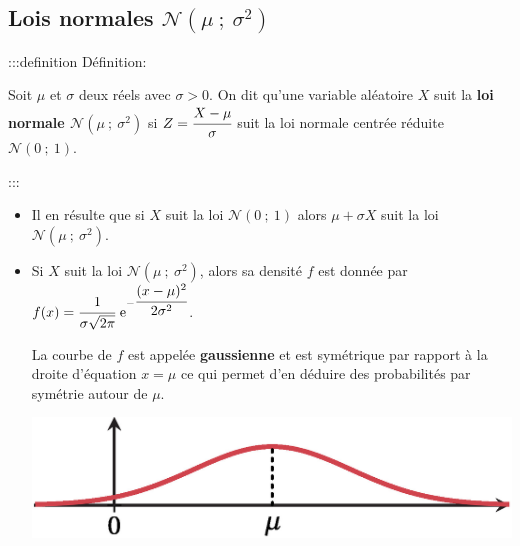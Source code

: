 \documentclass{cornouaille}
\begin{document}
\subsection{Lois normales $\mathcal{N}(\mu\ ;\ \sigma^2)$}



:::definition Définition: 

 Soit $\mu$ et $\sigma$ deux
réels avec $\sigma>0$. On dit qu'une variable aléatoire $X$ suit la
\textbf{loi normale $\mathcal{N}(\mu\ ;\ \sigma^2)$} si
$Z=\cfrac{X-\mu}{\sigma}$ suit la loi normale centrée réduite
$\mathcal{N}(0\ ;\ 1)$.


:::



\begin{remarques}

\begin{itemize}
\item Il en résulte que si $X$ suit la loi $\mathcal{N}(0\ ;\ 1)$ alors $\mu+\sigma X$ suit la loi $\mathcal{N}(\mu\ ;\ \sigma^2)$.
\item Si $X$ suit la loi $\mathcal{N}(\mu\ ;\ \sigma^2)$,
alors sa densité $f$ est donnée par
${f(x)=\cfrac{1}{\sigma\sqrt{2\pi}}\textrm{ e}^{-\cfrac{(x-\mu)^2}{2\sigma^2}}}$.


La courbe de $f$ est appelée \textbf{gaussienne} et est symétrique par rapport à la droite d'équation $x=\mu$ ce qui permet d'en déduire des probabilités par symétrie autour de $\mu$.






\includegraphics{./TS-Variables-10}





\end{itemize}


\end{remarques}
\end{document}
